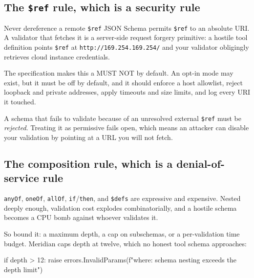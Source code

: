 \subsection{The \texttt{\$ref} rule, which is a security rule}

\begin{dangerbox}{Never dereference a remote \texttt{\$ref}}
JSON Schema permits \texttt{\$ref} to an absolute URI. A validator that fetches
it is a server-side request forgery primitive: a hostile tool definition points
\texttt{\$ref} at \texttt{http://169.254.169.254/} and your validator obligingly
retrieves cloud instance credentials.

The specification makes this a MUST NOT by default. An opt-in mode may exist,
but it must be off by default, and it should enforce a host allowlist, reject
loopback and private addresses, apply timeouts and size limits, and log every
URI it touched.
\end{dangerbox}


A schema that fails to validate because of an unresolved external \texttt{\$ref}
must be \emph{rejected}. Treating it as permissive fails open, which
means an attacker can disable your validation by pointing at a URL you will not
fetch.

\subsection{The composition rule, which is a denial-of-service rule}

\texttt{anyOf}, \texttt{oneOf}, \texttt{allOf}, \texttt{if}/\texttt{then}, and
\texttt{\$defs} are expressive and expensive. Nested deeply enough, validation
cost explodes combinatorially, and a hostile schema becomes a CPU bomb against
whoever validates it.

So bound it: a maximum depth, a cap on subschemas, or a per-validation time
budget. Meridian caps depth at twelve, which no honest tool schema approaches:

\begin{py}
if depth > 12:
    raise errors.InvalidParams(f"{where}: schema nesting exceeds the depth limit")
\end{py}

